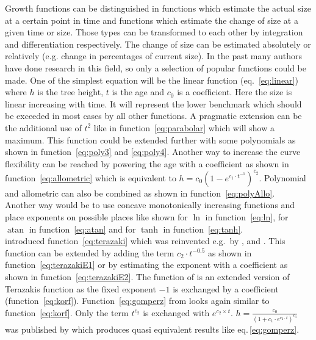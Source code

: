 \documentclass[a4paper,twocolumn]{article}
\DeclareMathOperator{\atan}{atan}
\begin{document}
Growth functions can be distinguished in functions which estimate the
actual size at a certain point in time and functions which estimate
the change of size at a given time or size. Those types can be
transformed to each other by integration and differentiation
respectively. The change of size can be estimated absolutely or relatively
(e.g. change in percentages of current size). In the past many authors
have done research in this field, so only a selection of popular
functions could be made. One of the simplest equation will be the
linear function (eq.~\ref{eq:linear}) where $h$ is the tree height,
$t$ is the age and $c_0$ is a coefficient. Here the size is linear
increasing with time. It will represent the lower benchmark which
should be exceeded in most cases by all other functions. A pragmatic
extension can be the additional use of $t^2$ like in
function~\ref{eq:parabolar} which will show a maximum. This function
could be extended further with some polynomials as shown in
function~\ref{eq:poly3} and \ref{eq:poly4}. Another way to increase
the curve flexibility can be reached by powering the age with a
coefficient as shown in function~\ref{eq:allometric} which is
equivalent to $h = c_0 (1 - e^{c_1 \cdot t^{-1}} )^{c_2}$.
Polynomial and allometric can also be combined as shown in
function~\ref{eq:polyAllo}.\\
%
Another way would be to use concave monotonically increasing functions
and place exponents on possible places like shown for $\ln$ in
function~\ref{eq:ln}, for $\atan$ in function~\ref{eq:atan} and for
$\tanh$ in function~\ref{eq:tanh}.\\
%
\cite{terazaki1915GrowthCurves} introduced
function~\ref{eq:terazaki} which was reinvented e.g.\ by
\cite{johnson1935ATrendLineForGrowthSeries},
\cite{Schumacher1939Function} and \cite{michailoff1943Hoehenkurven}.
This function can be extended by adding the term $c_2\cdot
t^{-0.5}$ as shown in function~\ref{eq:terazakiE1} or by estimating
the exponent with a coefficient as shown in
function~\ref{eq:terazakiE2}.
The function of \cite{korf1939Funktion} is an extended version of
Terazakis function as the fixed exponent $-1$ is exchanged by a
coefficient (function~\ref{eq:korf}). Function~\ref{eq:gomperz} from
\cite{gompertz1825} looks again similar to
function~\ref{eq:korf}. Only the term $t^{c_2}$ is exchanged with
$e^{c_2\times t}$.
$h = \frac{c_0}{(1+c_1 \cdot e^{c_2 \cdot t})^{c_3}}$ 
was published by \cite{stannard1985GrowthFunction} which produces
quasi equivalent results like eq.\,\ref{eq:gomperz}.
\cite{sloboda1971Wachstumsprozesse}
\end{document}
